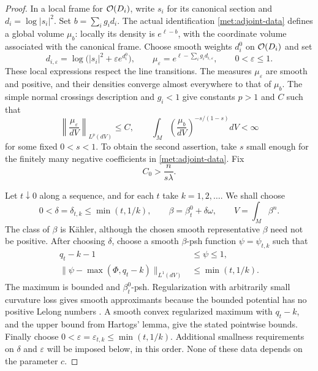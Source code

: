 \begin{proof}
In a local frame for \(\mathcal{O}(D_i)\), write \(s_i\) for its canonical
section and \(d_i=\log|s_i|^2\).  Set \(b=\sum_i g_i d_i\).
The actual identification \eqref{met:adjoint-data} defines a global
volume \(\mu_b\): locally its density is \(e^{\ell-b}\), with the
coordinate volume associated with the canonical frame.  Choose smooth
weights \(d_i^0\) on \(\mathcal{O}(D_i)\) and set
\begin{equation}
 \label{met:regularized-density}
 d_{i,\varepsilon}
   =\log\bigl(|s_i|^2+\varepsilon e^{d_i^0}\bigr),
 \qquad
 \mu_\varepsilon=e^{\ell-\sum_i g_i d_{i,\varepsilon}},
 \qquad 0<\varepsilon\leq1.
\end{equation}
These local expressions respect the line transitions.  The measures
\(\mu_\varepsilon\) are smooth and positive, and their densities converge
almost everywhere to that of \(\mu_b\).  The simple normal crossings
description and \(g_i<1\) give constants \(p>1\) and \(C\) such that
\begin{equation}
 \label{met:density-moments}
 \left\|\frac{\mu_\varepsilon}{dV}\right\|_{L^p(dV)}\leq C,
 \qquad
 \int_M\left(\frac{\mu_b}{dV}\right)^{-s/(1-s)}dV<\infty
\end{equation}
for some fixed \(0<s<1\).  To obtain the second assertion, take \(s\)
small enough for the finitely many negative coefficients in
\eqref{met:adjoint-data}.  Fix
\begin{equation}
 \label{met:C-zero}
 C_0>\frac{n}{s\lambda}.
\end{equation}

Let \(t\downarrow0\) along a sequence, and for each \(t\) take
\(k=1,2,\ldots\).  We shall choose
\[
 0<\delta=\delta_{t,k}\leq\min(t,1/k),
 \qquad
 \beta=\beta_t^0+\delta\omega,
 \qquad
 V=\int_M\beta^n.
\]
The class of \(\beta\) is K\"ahler, although the chosen smooth
representative \(\beta\) need not be positive.  After choosing
\(\delta\), choose a smooth \(\beta\)-psh function \(\psi=\psi_{t,k}\)
such that
\begin{equation}
 \label{met:psi-approximation}
 \begin{split}
 q_t-k-1&\leq\psi\leq1,\\
 \bigl\|\psi-\max(\Phi,q_t-k)\bigr\|_{L^1(dV)}
    &\leq\min(t,1/k).
 \end{split}
\end{equation}
The maximum is bounded and \(\beta_t^0\)-psh.  Regularization with
arbitrarily small curvature loss gives smooth approximants because
the bounded potential has no positive Lelong numbers
\cite{DemaillyRegularization}.  A smooth convex regularized maximum with
\(q_t-k\), and the upper bound from Hartogs' lemma, give the stated
pointwise bounds.  Finally choose
\(0<\varepsilon=\varepsilon_{t,k}\leq\min(t,1/k)\).
Additional smallness requirements on \(\delta\) and \(\varepsilon\)
will be imposed below, in this order.  None of these data depends on
the parameter \(c\).


\end{proof}
